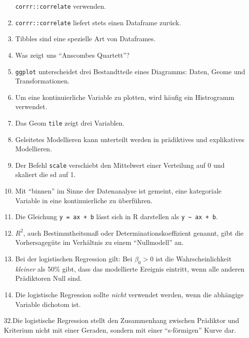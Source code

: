 \documentclass[12pt,ngerman,]{book}
\begin{document}
\begin{enumerate}
  \texttt{corrr::correlate} verwenden.
\item
  \texttt{corrr::correlate} liefert stets einen Dataframe zurück.
\item
  Tibbles sind eine spezielle Art von Dataframes.
\item
  Was zeigt uns ``Anscombes Quartett''?
\item
  \texttt{ggplot} unterscheidet drei Bestandtteile eines Diagramms:
  Daten, Geome und Transformationen.
\item
  Um eine kontinuierliche Variable zu plotten, wird häufig ein
  Histrogramm verwendet.
\item
  Das Geom \texttt{tile} zeigt drei Variablen.
\item
  Geleitetes Modellieren kann unterteilt werden in prädiktives und
  explikatives Modellieren.
\item
  Der Befehl \texttt{scale} verschiebt den Mittelwert einer Verteilung
  auf 0 und skaliert die sd auf 1.
\item
  Mit ``binnen'' im Sinne der Datenanalyse ist gemeint, eine kategoriale
  Variable in eine kontinuierliche zu überführen.
\item
  Die Gleichung \texttt{y\ =\ ax\ +\ b} lässt sich in R darstellen als
  \texttt{y\ \textasciitilde{}\ ax\ +\ b}.
\item
  \(R^2\), auch Bestimmtheitsmaß oder Determinationskoeffizient genannt,
  gibt die Vorhersagegüte im Verhältnis zu einem ``Nullmodell'' an.
\item
  Bei der logistischen Regression gilt: Bei \(\beta_0>0\) ist die
  Wahrscheinlichkeit \emph{kleiner} als 50\% gibt, dass das modellierte
  Ereignis eintritt, wenn alle anderen Prädiktoren Null sind.
\item
  Die logistische Regression sollte \emph{nicht} verwendet werden, wenn
  die abhängige Variable dichotom ist.
\end{enumerate}

32.Die logistische Regression stellt den Zusammenhang zwischen Prädiktor
und Kriterium nicht mit einer Geraden, sondern mit einer ``s-förmigen''
Kurve dar.
\end{document}
